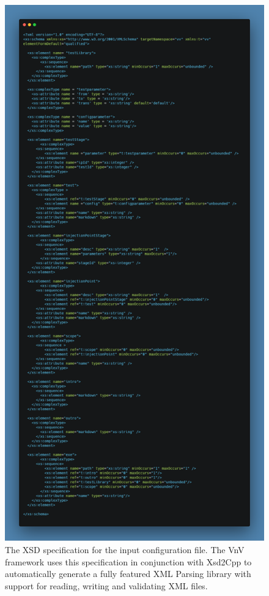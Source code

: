 \begin{figure}
\centering
 \includegraphics[height=0.9\textheight, width=\textwidth, keepaspectratio]{./Figures/xsd-schema.png}
\caption{The XSD specification for the input configuration file. The VnV framework uses this specification in conjunction with Xsd2Cpp to automatically generate
a fully featured XML Parsing library with support for reading, writing and validating XML files. \label{fig:xsd_specification}}
 \end{figure}

